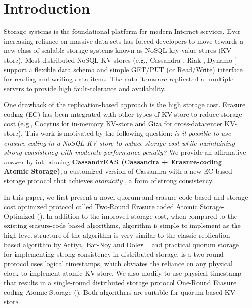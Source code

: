 \section{Introduction}
\label{sec:intro}



Storage systems is the foundational platform for modern Internet services. Ever increasing reliance on massive data sets has forced developers to move towards a new class of scalable storage systems known as NoSQL key-value stores (KV-store). Most distributed NoSQL KV-stores (e.g., Cassandra \cite{Cassandra}, Riak \cite{Riak}, Dynamo \cite{Dynamo}) support a flexible data schema and simple GET/PUT (or Read/Write) interface for reading and writing data items. 
The data items are replicated at multiple servers to provide high fault-tolerance and availability. 

One drawback of the replication-based approach is the high storage cost. Erasure coding (EC) has been integrated with other types of KV-store to reduce storage cost (e.g., Cocytus \cite{Cocytus2016} for in-memory KV-store  and Giza \cite{GIZA2017} for cross-datacenter KV-store).
This work is motivated by the following question: \textit{is it possible to use erasure coding in a NoSQL KV-store to reduce storage cost while maintaining strong consistency with moderate performance penalty?} We provide an affirmative answer by introducing \textbf{CassandrEAS (Cassandra + Erasure-coding Atomic Storage)}, a customized version of Cassandra \cite{Cassandra} with a new EC-based storage protocol that achieves \textit{atomicity} \cite{lamport}, a form of strong consistency. 

In this paper, we first present a novel quorum and erasure-code-based and storage cost optimized protocol called Two-Round Erasure coded Atomic Storage-Optimized (\treasmod{}). In addition to the improved storage cost, when compared to the existing erasure-code based algorithms, \treasmod{} algorithm is simple to implement as the high-level structure of the algorithm is very similar to the classic replication-based algorithm by Attiya, Bar-Noy and Dolev ~\cite{ABD96} and practical quorum storage ~\cite{Dynamo,pbs-vldb2012} for implementing strong consistency in distributed storage. \treasmod{} is a two-round protocol uses logical timestamps, which obviates the reliance on  any physical clock to implement atomic KV-store. We also modify \treasmod{} to use physical timestamp that results in a single-round distributed storage protocol One-Round Erasure coding Atomic Storage (\oreas). Both algorithms are suitable for quorum-based KV-store.%



